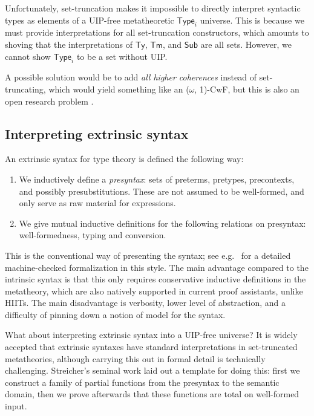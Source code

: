 \documentclass[dvipsnames]{lmcs} %
\newcommand{\Ty}{\mathsf{Ty}}
\newcommand{\Tm}{\mathsf{Tm}}
\newcommand{\Sub}{\mathsf{Sub}}
\newcommand{\1}{\mathsf{1}} \renewcommand{\Pr}{\mathsf{Pr}}
\theoremstyle{plain}\newtheorem{satz}[thm]{Satz} %
\begin{document}
Unfortunately, set-truncation makes it impossible to directly interpret
syntactic types as elements of a UIP-free metatheoretic $\mathsf{Type}_i$
universe. This is because we must provide interpretations for all set-truncation
constructors, which amounts to shoving that the interpretations of $\Ty$,
$\Tm$, and $\Sub$ are all sets. However, we cannot show $\mathsf{Type}_i$ to be a
set without UIP.

A possible solution would be to add \emph{all higher coherences} instead of
set-truncating, which would yield something like an ($\omega$, 1)-CwF, but this
is also an open research problem \cite{altenkirch2018towards, finster2019structure}.

\subsection{Interpreting extrinsic syntax}
An extrinsic syntax for type theory is defined the following way:
\begin{enumerate}
\item We inductively define a \emph{presyntax}: sets of preterms, pretypes,
      precontexts, and possibly presubstitutions. These are not assumed to
      be well-formed, and only serve as raw material for expressions.
\item We give mutual inductive definitions for the following relations on presyntax:
      well-formedness, typing and conversion.
\end{enumerate}

This is the conventional way of presenting the syntax; see
e.g.\ \cite{winterhalter2019eliminating} for a detailed machine-checked
formalization in this style. The main advantage compared to the intrinsic syntax
is that this only requires conservative inductive definitions in the metatheory,
which are also natively supported in current proof assistants, unlike HIITs. The
main disadvantage is verbosity, lower level of abstraction, and a difficulty of
pinning down a notion of model for the syntax.

What about interpreting extrinsic syntax into a UIP-free universe? It is widely
accepted that extrinsic syntaxes have standard interpretations in set-truncated
metatheories, although carrying this out in formal detail is technically
challenging. Streicher's seminal work \cite{streicher2012semantics} laid out a
template for doing this: first we construct a family of partial functions from
the presyntax to the semantic domain, then we prove afterwards that these
functions are total on well-formed input.
\end{document}
